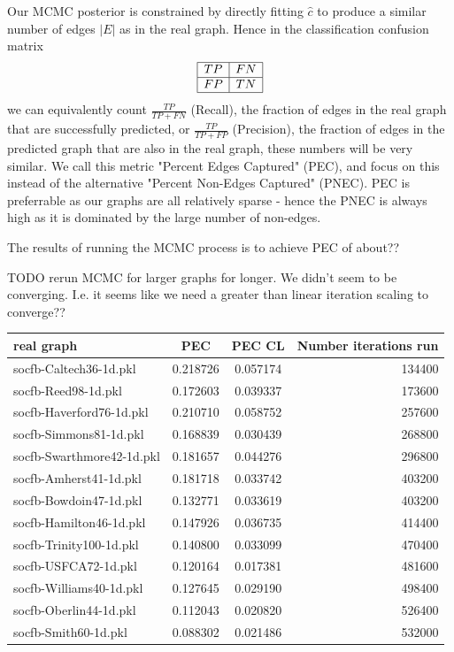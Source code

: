 Our MCMC posterior is constrained by directly fitting $\hat{c}$ to produce a similar number of edges $|E|$ as in the real graph. Hence in the classification confusion matrix
\begin{equation}
  \begin{array}{|c|c|}
    \hline
    TP & FN \\
    \hline
    FP & TN \\
    \hline
    \end{array}
\end{equation}
we can equivalently count $\frac{TP}{TP + FN}$ (Recall), the fraction of edges in the real graph that are successfully predicted, or $\frac{TP}{TP + FP}$ (Precision), the fraction of edges in the predicted graph that are also in the real graph, these numbers will be very similar. We call this metric "Percent Edges Captured" (PEC), and focus on this instead of the alternative "Percent Non-Edges Captured" (PNEC). PEC is preferrable as our graphs are all relatively sparse - hence the PNEC is always high as it is dominated by the large number of non-edges.


The results of running the MCMC process is to achieve PEC of about??

TODO rerun MCMC for larger graphs for longer. We didn't seem to be converging. I.e. it seems like we need a greater than linear iteration scaling to converge??

\begin{tabular}{|l|c|c|r|}
  \hline
  real graph & PEC & PEC CL & Number iterations run \\
  \hline
  socfb-Caltech36-1d.pkl & 0.218726 & 0.057174 & 134400 \\
  socfb-Reed98-1d.pkl & 0.172603 & 0.039337 & 173600 \\
  socfb-Haverford76-1d.pkl & 0.210710 & 0.058752 & 257600 \\
  socfb-Simmons81-1d.pkl & 0.168839 & 0.030439 & 268800 \\
  socfb-Swarthmore42-1d.pkl & 0.181657 & 0.044276 & 296800 \\
  socfb-Amherst41-1d.pkl & 0.181718 & 0.033742 & 403200 \\
  socfb-Bowdoin47-1d.pkl & 0.132771 & 0.033619 & 403200 \\
  socfb-Hamilton46-1d.pkl & 0.147926 & 0.036735 & 414400 \\
  socfb-Trinity100-1d.pkl & 0.140800 & 0.033099 & 470400 \\
  socfb-USFCA72-1d.pkl & 0.120164 & 0.017381 & 481600 \\
  socfb-Williams40-1d.pkl & 0.127645 & 0.029190 & 498400 \\
  socfb-Oberlin44-1d.pkl & 0.112043 & 0.020820 & 526400 \\
  socfb-Smith60-1d.pkl & 0.088302 & 0.021486 & 532000 \\
  \hline
  \end{tabular}



